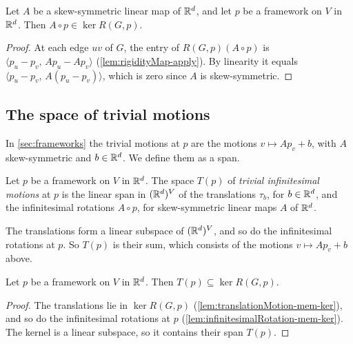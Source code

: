 \begin{lemma}
  \label{lem:infinitesimalRotation-mem-ker}
  \leanok
  Let $A$ be a skew-symmetric linear map of ${\mathbb{R}}^{d}$, and let $p$ be a
  framework on $V$ in ${\mathbb{R}}^{d}$. Then $A \circ p \in \ker R(G, p)$.
\end{lemma}
\begin{proof}
  \leanok
  At each edge $uv$ of $G$, the entry of $R(G, p)(A \circ p)$ is
  $\langle p_u - p_v,\, A p_u - A p_v \rangle$
  (\cref{lem:rigidityMap-apply}). By linearity it equals
  $\langle p_u - p_v,\, A (p_u - p_v) \rangle$, which is zero since $A$
  is skew-symmetric.
\end{proof}

\subsection{The space of trivial motions}

In \cref{sec:frameworks} the trivial motions at $p$ are the motions
$v \mapsto A p_v + b$, with $A$ skew-symmetric and $b \in {\mathbb{R}}^{d}$. We
define them as a span.

\begin{definition}
  \label{def:trivialMotions}
  \leanok
  Let $p$ be a framework on $V$ in ${\mathbb{R}}^{d}$. The space $T(p)$ of
  \emph{trivial infinitesimal motions} at $p$ is the linear span in
  $({\mathbb{R}}^{d})^{V}$ of the translations $\tau_b$, for $b \in {\mathbb{R}}^{d}$, and
  the infinitesimal rotations $A \circ p$, for skew-symmetric linear
  maps $A$ of ${\mathbb{R}}^{d}$.
\end{definition}
The translations form a linear subspace of $({\mathbb{R}}^{d})^{V}$, and so do
the infinitesimal rotations at $p$. So $T(p)$ is their sum, which
consists of the motions $v \mapsto A p_v + b$ above.

\begin{lemma}
  \label{lem:trivialMotions-le-ker}
  \leanok
  Let $p$ be a framework on $V$ in ${\mathbb{R}}^{d}$. Then
  $T(p) \subseteq \ker R(G, p)$.
\end{lemma}
\begin{proof}
  \leanok
  The translations lie in $\ker R(G, p)$
  (\cref{lem:translationMotion-mem-ker}), and so do the infinitesimal
  rotations at $p$ (\cref{lem:infinitesimalRotation-mem-ker}). The
  kernel is a linear subspace, so it contains their span $T(p)$.
\end{proof}

